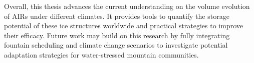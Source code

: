 Overall, this thesis advances the current understanding on the volume evolution of AIRs under different
climates. It provides tools to quantify the storage potential of these ice structures worldwide and practical
strategies to improve their efficacy. Future work may build on this research by fully integrating fountain
scheduling and climate change scenarios to investigate potential adaptation strategies for water-stressed
mountain communities.



